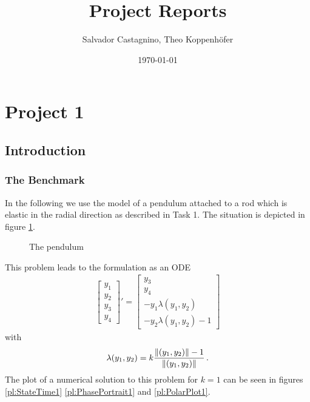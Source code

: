 \documentclass{report}
\title{Project Reports}
\author{Salvador Castagnino, Theo Koppenhöfer}
\date{\today}
\DeclarePairedDelimiter{\norm}{\lVert}{\rVert}
\newcommand{\vect}[1]{\begin{bmatrix} #1 \end{bmatrix}}
\begin{document}
\maketitle

\chapter*{Project 1}

\section*{Introduction}

\subsection*{The Benchmark}

In the following we use the model of a pendulum attached to a rod which is elastic in the radial direction as described in Task 1. The situation is depicted in figure \ref{dr:Pendulum}.

\begin{figure}
\centering

\caption{The pendulum}
\label{dr:Pendulum}
\end{figure}

This problem leads to the formulation as an ODE
\begin{align*}
	\vect{y_1 \\ y_2 \\ y_3 \\ y_4}' = \vect{y_3 \\ y_4 \\ -y_1\lambda(y_1,y_2) \\ -y_2\lambda(y_1,y_2)-1}
\end{align*}
with
\begin{align*}
	\lambda(y_1,y_2)=k\frac{\norm{(y_1,y_2)}-1}{\norm{(y_1,y_2)}}\,.
\end{align*}
The plot of a numerical solution to this problem for $k=1$ can be seen in figures \ref{pl:StateTime1} \ref{pl:PhasePortrait1} and \ref{pl:PolarPlot1}.
\end{document}
